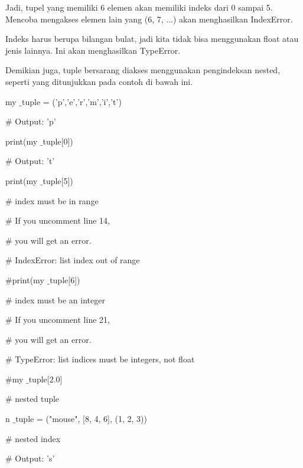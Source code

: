 \vspace{12pt}
Jadi, tupel yang memiliki 6 elemen akan memiliki indeks dari 0 sampai 5. Mencoba mengakses elemen lain yang (6, 7, ...) akan menghasilkan IndexError. \par
\vspace{12pt}
Indeks harus berupa bilangan bulat, jadi kita tidak bisa menggunakan float atau jenis lainnya. Ini akan menghasilkan TypeError. \par
\vspace{12pt}
Demikian juga, tuple bersarang diakses menggunakan pengindeksan nested, seperti yang ditunjukkan pada contoh di bawah ini. \par
my $  \_  $tuple = ('p','e','r','m','i','t') \par
\vspace{12pt}
 $  \#  $ Output: 'p' \par
print(my $  \_  $tuple[0]) \par
\vspace{12pt}
 $  \#  $ Output: 't' \par
print(my $  \_  $tuple[5]) \par
\vspace{12pt}
 $  \#  $ index must be in range \par
 $  \#  $ If you uncomment line 14, \par
 $  \#  $ you will get an error. \par
 $  \#  $ IndexError: list index out of range \par
\vspace{12pt}
 $  \#  $print(my $  \_  $tuple[6]) \par
\vspace{12pt}
 $  \#  $ index must be an integer \par
 $  \#  $ If you uncomment line 21, \par
 $  \#  $ you will get an error. \par
 $  \#  $ TypeError: list indices must be integers, not float \par
\vspace{12pt}
 $  \#  $my $  \_  $tuple[2.0] \par
\vspace{12pt}
 $  \#  $ nested tuple \par
n $  \_  $tuple = ("mouse", [8, 4, 6], (1, 2, 3)) \par
\vspace{12pt}
 $  \#  $ nested index \par
 $  \#  $ Output: 's' \par
